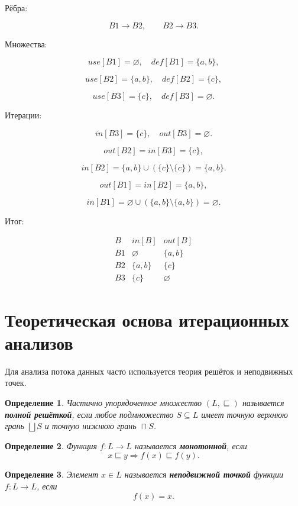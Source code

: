 \documentclass[12pt,a4paper]{article}
\DeclareMathOperator*{\bigsqcap}{\sqcap}
\newtheorem{definition}{Определение}
\begin{document}
Рёбра:

\[
B1 \to B2,\qquad B2 \to B3.
\]

Множества:

\[
use[B1]=\varnothing,\quad def[B1]=\{a,b\},
\]

\[
use[B2]=\{a,b\},\quad def[B2]=\{c\},
\]

\[
use[B3]=\{c\},\quad def[B3]=\varnothing.
\]

Итерации:

\[
in[B3]=\{c\},\quad out[B3]=\varnothing.
\]

\[
out[B2]=in[B3]=\{c\},
\]

\[
in[B2]=\{a,b\}\cup(\{c\}\setminus\{c\})=\{a,b\}.
\]

\[
out[B1]=in[B2]=\{a,b\},
\]

\[
in[B1]=\varnothing\cup(\{a,b\}\setminus\{a,b\})=\varnothing.
\]

Итог:

\[
\begin{array}{c|c|c}
B & in[B] & out[B] \\
\hline
B1 & \varnothing & \{a,b\} \\
B2 & \{a,b\} & \{c\} \\
B3 & \{c\} & \varnothing
\end{array}
\]

\section{Теоретическая основа итерационных анализов}

Для анализа потока данных часто используется теория решёток и неподвижных точек.

\begin{definition}
Частично упорядоченное множество $(L,\sqsubseteq)$ называется \textbf{полной решёткой}, если любое подмножество $S \subseteq L$ имеет точную верхнюю грань $\bigsqcup S$ и точную нижнюю грань $\bigsqcap S$.
\end{definition}

\begin{definition}
Функция $f : L \to L$ называется \textbf{монотонной}, если
\[
x \sqsubseteq y \Rightarrow f(x) \sqsubseteq f(y).
\]
\end{definition}

\begin{definition}
Элемент $x \in L$ называется \textbf{неподвижной точкой} функции $f : L \to L$, если
\[
f(x)=x.
\]
\end{definition}
\end{document}
